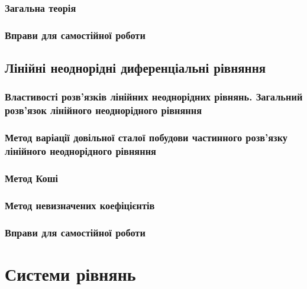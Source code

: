 		\subsubsection{Загальна теорія}
		

		\subsubsection{Вправи для самостійної роботи}
		

	\subsection{Лінійні неоднорідні диференціальні рівняння}
	

		\subsubsection{Властивості розв'язків лінійних неоднорідних рівнянь. Загальний розв'язок лінійного неоднорідного рівняння}
		

		\subsubsection{Метод варіації довільної сталої побудови частинного роз\-в'яз\-ку лінійного неоднорідного рівняння}
		

		\subsubsection{Метод Коші}
		

		\subsubsection{Метод невизначених коефіцієнтів}
		

		\subsubsection{Вправи для самостійної роботи}
		

\section{Системи рівнянь}



